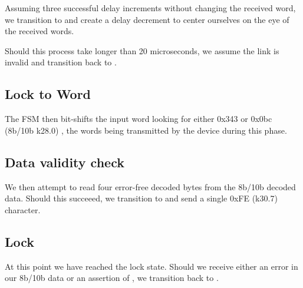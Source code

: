 Assuming three successful delay increments without changing the
received word, we transition to  and create a delay
decrement to center ourselves on the eye of the received words.

Should this process take longer than 20 microseconds, we assume the
link is invalid and transition back to .

\subsection{Lock to Word}
The FSM then bit-shifts the input word looking for either 0x343 or
0x0bc (8b/10b k28.0) , the words being transmitted by the device
during this phase.

\subsection{Data validity check}

We then attempt to read four error-free decoded bytes from the 8b/10b
decoded data. Should this succeeed, we transition to 
and send a single 0xFE (k30.7) character.

\subsection{Lock}

At this point we have reached the lock state. Should we receive either
an error in our 8b/10b data or an assertion of , we
transition back to .
